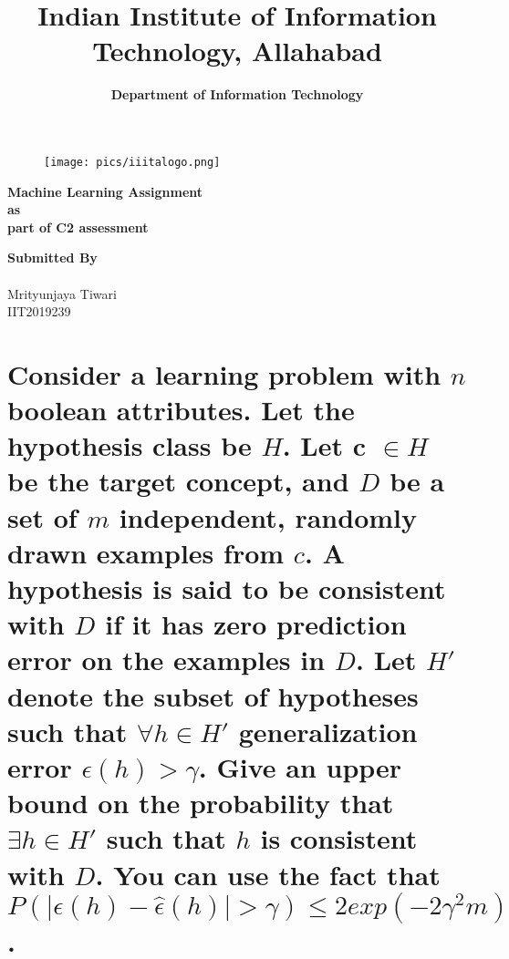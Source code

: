 \documentclass{article}
\title{\textbf{ Indian Institute of Information Technology, Allahabad 
}}
\date{\LARGE\textbf{Department of Information Technology}}
\begin{document}
\clearpage\maketitle

\thispagestyle{empty}

\begin{center} 
    \begin{figure}[h]
        \centering
        \texttt{[image: pics/iiitalogo.png]}
        \label{fig:logo}
    \end{figure}
    \vspace{10mm}
    \LARGE\textbf{Machine Learning Assignment}\\ \vspace{15mm}
         \textbf{as }	\\\vspace{15mm}
         \textbf{part of C2 assessment }\\	\vspace{30mm}
        
        
     
     \smallskip
     \hfill  \textbf{Submitted By }\\	\vspace{2mm}\\
     \hfill \LARGE{Mrityunjaya Tiwari}\\
     \hfill \LARGE{IIT2019239}\\
    
         

    
\end{center}
\newpage
\setcounter{page}{1}
\newpage



\section{Consider a learning problem with $n$ boolean attributes. Let the hypothesis class be $H$. Let c $\in H$ be the target concept, and $D$ be a set of $m$ independent, randomly drawn examples from $c$. A hypothesis is said to be consistent with $D$ if it has zero prediction error on the examples in $D$. Let $H'$ denote the subset of hypotheses such that $\forall h \in H'$ generalization error $\epsilon(h) > \gamma$. Give an upper bound on the probability that $\exists h \in H'$ such that $h$ is consistent with $D$. You can use the fact that $P(|\epsilon(h) - \hat{\epsilon}(h)| > \gamma) \leq 2exp(-2\gamma^2m)$.}
\end{document}
